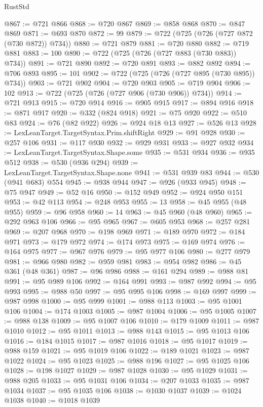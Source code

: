 \begin{lexlean}{RustStd}
\begin{coremodule}
{\begin{coremodule}
{{{{{{{{{{{{{{{{{{{{{{{{{{{{{{{{{{{{{{{@867 := @721 @866
@868 := @720 @867
@869 := @858 @868
@870 := @847 @869
@871 := @693 @870
@872 := 99
@879 := @722 (@725 (@726 (@727 @872 (@730 @872)) @734))
@880 := @721 @879
@881 := @720 @880
@882 := @719 @881
@883 := 100
@890 := @722 (@725 (@726 (@727 @883 (@730 @883)) @734))
@891 := @721 @890
@892 := @720 @891
@893 := @882 @892
@894 := @706 @893
@895 := 101
@902 := @722 (@725 (@726 (@727 @895 (@730 @895)) @734))
@903 := @721 @902
@904 := @720 @903
@905 := @719 @904
@906 := 102
@913 := @722 (@725 (@726 (@727 @906 (@730 @906)) @734))
@914 := @721 @913
@915 := @720 @914
@916 := @905 @915
@917 := @894 @916
@918 := @871 @917
@920 := @332 (@824 @918)
@921 := @75 @920
@922 := @510 @83
@924 := @76 (@82 @922)
@926 := @924 @18 @13
@927 := @526 @13
@928 := LexLeanTarget.TargetSyntax.Prim.shiftRight
@929 := @91 @928
@930 := @257 @106
@931 := @117 @930
@932 := @929 @931
@933 := @927 @932
@934 := LexLeanTarget.TargetSyntax.Shape.some
@935 := @531 @934
@936 := @935 @512
@938 := @530 (@936 @294)
@939 := LexLeanTarget.TargetSyntax.Shape.none
@941 := @531 @939 @83
@944 := @530 (@941 @683) @554
@945 := @938 @944
@947 := @926 (@933 @945)
@948 := @75 @947
@949 := @52 @16
@950 := @152 @949
@952 := @924 @950 @151
@953 := @42 @113
@954 := @248 @953
@955 := 13
@958 := @45 @955 (@48 @955)
@959 := @96 @958
@960 := 14
@963 := @45 @960 (@48 @960)
@965 := @292 @963 @106
@966 := @95 @965
@967 := @605 @953
@968 := @257 @281
@969 := @207 @968
@970 := @198 @969
@971 := @189 @970
@972 := @184 @971
@973 := @179 @972
@974 := @174 @973
@975 := @169 @974
@976 := @164 @975
@977 := @967 @976
@979 := @95 @977 @106
@980 := @277 @979
@981 := @966 @980
@982 := @959 @981
@983 := @954 @982
@986 := @45 @361 (@48 @361)
@987 := @96 @986
@988 := @161 @294
@989 := @988 @81
@991 := @95 @989 @106
@992 := @164 @991
@993 := @987 @992
@994 := @95 @993
@995 := @988 @50
@997 := @95 @995 @106
@998 := @169 @997
@999 := @987 @998
@1000 := @95 @999
@1001 := @988 @113
@1003 := @95 @1001 @106
@1004 := @174 @1003
@1005 := @987 @1004
@1006 := @95 @1005
@1007 := @988 @138
@1009 := @95 @1007 @106
@1010 := @179 @1009
@1011 := @987 @1010
@1012 := @95 @1011
@1013 := @988 @143
@1015 := @95 @1013 @106
@1016 := @184 @1015
@1017 := @987 @1016
@1018 := @95 @1017
@1019 := @988 @159
@1021 := @95 @1019 @106
@1022 := @189 @1021
@1023 := @987 @1022
@1024 := @95 @1023
@1025 := @988 @196
@1027 := @95 @1025 @106
@1028 := @198 @1027
@1029 := @987 @1028
@1030 := @95 @1029
@1031 := @988 @205
@1033 := @95 @1031 @106
@1034 := @207 @1033
@1035 := @987 @1034
@1037 := @95 @1035 @106
@1038 := @1030 @1037
@1039 := @1024 @1038
@1040 := @1018 @1039
}}}}}}}}}}}}}}}}}}}}}}}}}}}}}}}}}}}}}}}
\end{coremodule}}
\end{coremodule}
\end{lexlean}
